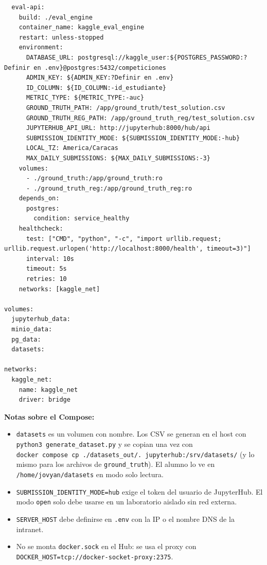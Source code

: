 \documentclass[11pt,a4paper]{article}
\providecommand{\tightlist}{%
  \setlength{\itemsep}{0pt}\setlength{\parskip}{0pt}}
\begin{document}
\begin{lstlisting}
  eval-api:
    build: ./eval_engine
    container_name: kaggle_eval_engine
    restart: unless-stopped
    environment:
      DATABASE_URL: postgresql://kaggle_user:${POSTGRES_PASSWORD:?Definir en .env}@postgres:5432/competiciones
      ADMIN_KEY: ${ADMIN_KEY:?Definir en .env}
      ID_COLUMN: ${ID_COLUMN:-id_estudiante}
      METRIC_TYPE: ${METRIC_TYPE:-auc}
      GROUND_TRUTH_PATH: /app/ground_truth/test_solution.csv
      GROUND_TRUTH_REG_PATH: /app/ground_truth_reg/test_solution.csv
      JUPYTERHUB_API_URL: http://jupyterhub:8000/hub/api
      SUBMISSION_IDENTITY_MODE: ${SUBMISSION_IDENTITY_MODE:-hub}
      LOCAL_TZ: America/Caracas
      MAX_DAILY_SUBMISSIONS: ${MAX_DAILY_SUBMISSIONS:-3}
    volumes:
      - ./ground_truth:/app/ground_truth:ro
      - ./ground_truth_reg:/app/ground_truth_reg:ro
    depends_on:
      postgres:
        condition: service_healthy
    healthcheck:
      test: ["CMD", "python", "-c", "import urllib.request; urllib.request.urlopen('http://localhost:8000/health', timeout=3)"]
      interval: 10s
      timeout: 5s
      retries: 10
    networks: [kaggle_net]

volumes:
  jupyterhub_data:
  minio_data:
  pg_data:
  datasets:

networks:
  kaggle_net:
    name: kaggle_net
    driver: bridge
\end{lstlisting}

\textbf{Notas sobre el Compose:}

\begin{itemize}
\tightlist
\item
  \texttt{datasets} es un volumen con nombre. Los CSV se generan en el host con \texttt{python3\ generate\_\allowbreak{}dataset.\allowbreak{}py} y se copian una vez con \texttt{docker\ compose\ cp\ .\allowbreak{}/\allowbreak{}datasets\_\allowbreak{}out/\allowbreak{}.\allowbreak{}\ jupyterhub:\allowbreak{}/\allowbreak{}srv/\allowbreak{}datasets/\allowbreak{}} (y lo mismo para los archivos de \texttt{ground\_\allowbreak{}truth}). El alumno lo ve en \texttt{/\allowbreak{}home/\allowbreak{}jovyan/\allowbreak{}datasets} en modo solo lectura.
\item
  \texttt{SUBMISSION\_\allowbreak{}IDENTITY\_\allowbreak{}MODE=hub} exige el token del usuario de JupyterHub. El modo \texttt{open} solo debe usarse en un laboratorio aislado sin red externa.
\item
  \texttt{SERVER\_\allowbreak{}HOST} debe definirse en \texttt{.\allowbreak{}env} con la IP o el nombre DNS de la intranet.
\item
  No se monta \texttt{docker.\allowbreak{}sock} en el Hub: se usa el proxy con \texttt{DOCKER\_\allowbreak{}HOST=tcp:\allowbreak{}/\allowbreak{}/\allowbreak{}docker-\allowbreak{}socket-\allowbreak{}proxy:\allowbreak{}2375}.
\end{itemize}
\end{document}
